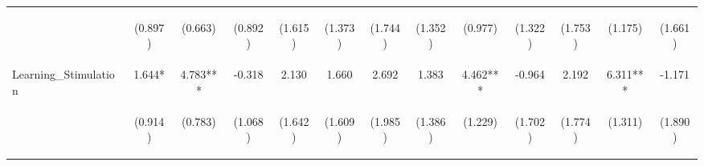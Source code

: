 \begin{tabular}{lcccccccccccc}
 & \begin{footnotesize}(0.897)\end{footnotesize} & \begin{footnotesize}(0.663)\end{footnotesize} & \begin{footnotesize}(0.892)\end{footnotesize} & \begin{footnotesize}(1.615)\end{footnotesize} & \begin{footnotesize}(1.373)\end{footnotesize} & \begin{footnotesize}(1.744)\end{footnotesize} & \begin{footnotesize}(1.352)\end{footnotesize} & \begin{footnotesize}(0.977)\end{footnotesize} & \begin{footnotesize}(1.322)\end{footnotesize} & \begin{footnotesize}(1.753)\end{footnotesize} & \begin{footnotesize}(1.175)\end{footnotesize} & \begin{footnotesize}(1.661)\end{footnotesize}\\
\noalign{\smallskip}Learning_Stimulation & 1.644* & 4.783*** & -0.318 & 2.130 & 1.660 & 2.692 & 1.383 & 4.462*** & -0.964 & 2.192 & 6.311*** & -1.171\\
 & \begin{footnotesize}(0.914)\end{footnotesize} & \begin{footnotesize}(0.783)\end{footnotesize} & \begin{footnotesize}(1.068)\end{footnotesize} & \begin{footnotesize}(1.642)\end{footnotesize} & \begin{footnotesize}(1.609)\end{footnotesize} & \begin{footnotesize}(1.985)\end{footnotesize} & \begin{footnotesize}(1.386)\end{footnotesize} & \begin{footnotesize}(1.229)\end{footnotesize} & \begin{footnotesize}(1.702)\end{footnotesize} & \begin{footnotesize}(1.774)\end{footnotesize} & \begin{footnotesize}(1.311)\end{footnotesize} & \begin{footnotesize}(1.890)\end{footnotesize}\\

\end{tabular}
